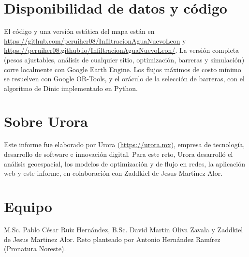 \section*{Disponibilidad de datos y código}

El código y una versión estática del mapa están en \url{https://github.com/pcruiher08/InfiltracionAguaNuevoLeon} y \url{https://pcruiher08.github.io/InfiltracionAguaNuevoLeon/}. La versión completa (pesos ajustables, análisis de cualquier sitio, optimización, barreras y simulación) corre localmente con Google Earth Engine. Los flujos máximos de costo mínimo se resuelven con Google OR-Tools, y el oráculo de la selección de barreras, con el algoritmo de Dinic implementado en Python.

\section*{Sobre Urora}

Este informe fue elaborado por Urora (\url{https://urora.mx}), empresa de tecnología, desarrollo de software e innovación digital. Para este reto, Urora desarrolló el análisis geoespacial, los modelos de optimización y de flujo en redes, la aplicación web y este informe, en colaboración con Zaddkiel de Jesus Martinez Alor.

\section*{Equipo}

M.Sc. Pablo César Ruíz Hernández, B.Sc. David Martin Oliva Zavala y Zaddkiel de Jesus Martinez Alor. Reto planteado por Antonio Hernández Ramírez (Pronatura Noreste).


